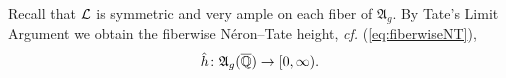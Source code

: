 


Recall that ${\mathcal L}$ is symmetric and very ample on each fiber of
$\mathfrak{A}_{g}$. 
By Tate's Limit Argument we obtain the fiberwise N\'eron--Tate height,
\textit{cf.} (\ref{eq:fiberwiseNT}), 
\begin{equation}
 \label{eq:NTfinemoduli}
  \hat h \colon \mathfrak{A}_{g}({\overline{\mathbb{Q}}})\rightarrow [0,\infty).
\end{equation}

